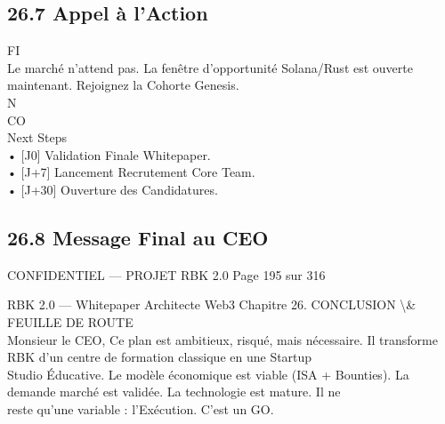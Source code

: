\documentclass[12pt,landscape,a4paper]{article}
\newenvironment{confidential}
{\begin{tcolorbox}[
    colback=rbkred!5!white,
    colframe=rbkred!75!black,
    title=CONFIDENTIEL,
    fonttitle=\bfseries\color{white},
    coltitle=rbkred!75!black,
    breakable,
    enhanced,
    frame hidden,
    borderline west={2pt}{0pt}{rbkred!75!black}
]}
{\end{tcolorbox}}
\begin{document}
\subsection{26.7 Appel à l’Action}
\vspace{0.5em}
\vspace{0.5em}
\vspace{0.5em}
FI\\
Le marché n’attend pas. La fenêtre d’opportunité Solana/Rust est ouverte maintenant. Rejoignez la Cohorte Genesis.\\
N\\
CO\\
Next Steps\\
\vspace{0.5em}
• [J0] Validation Finale Whitepaper.\\
\vspace{0.5em}
• [J+7] Lancement Recrutement Core Team.\\
\vspace{0.5em}
• [J+30] Ouverture des Candidatures.\\
\vspace{0.5em}
\vspace{0.5em}
\vspace{0.5em}
\subsection{26.8 Message Final au CEO}
\vspace{0.5em}
\vspace{0.5em}
\vspace{0.5em}
\begin{confidential}CONFIDENTIEL — PROJET RBK 2.0                               Page 195 sur 316\end{confidential}
RBK 2.0 — Whitepaper Architecte Web3                                                      Chapitre 26. CONCLUSION \textbackslash{}& FEUILLE DE ROUTE\\
\vspace{0.5em}
\vspace{0.5em}
\vspace{0.5em}
Monsieur le CEO, Ce plan est ambitieux, risqué, mais nécessaire. Il transforme RBK d’un centre de formation classique en une Startup\\
Studio Éducative. Le modèle économique est viable (ISA + Bounties). La demande marché est validée. La technologie est mature. Il ne\\
reste qu’une variable : l’Exécution. C’est un GO.\\
\vspace{0.5em}
\vspace{0.5em}
\end{document}

